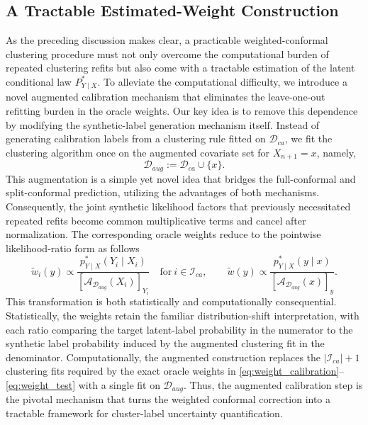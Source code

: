 \documentclass[11pt,letterpaper]{article}
\theoremstyle{definition}
\newcommand{\cD}{\mathcal{D}}
\newcommand{\cI}{\mathcal{I}}
\begin{document}
\subsection{A Tractable Estimated-Weight Construction}
As the preceding discussion makes clear, a practicable weighted-conformal clustering procedure must not only overcome the computational burden of repeated clustering refits but also come with a tractable estimation of the latent conditional law $P_{Y\mid X}^\ast$. To alleviate the computational difficulty, we introduce a novel augmented calibration mechanism that eliminates the leave-one-out refitting burden in the oracle weights. Our key idea is to remove this dependence by modifying the synthetic-label generation mechanism itself. Instead of generating calibration labels from a clustering rule fitted on \(\cD_{ca}\), we fit the clustering algorithm once on the augmented covariate set for $X_{n + 1} = x$, namely,
\[
    \cD_{aug}:=\cD_{ca}\cup\{x\}.
\]
This augmentation is a simple yet novel idea that bridges the full-conformal and split-conformal prediction, utilizing the advantages of both mechanisms. Consequently, the joint synthetic likelihood factors that previously necessitated repeated refits become common multiplicative terms and cancel after normalization. The corresponding oracle weights reduce to the pointwise likelihood-ratio form as follows
\begin{equation}
    \label{eq:augmented_oracle_weights}
    \tilde w_i(y)
    \propto
    \frac{p_{Y\mid X}^\ast\left(Y_i\mid X_i\right)}
    {\left[\mathcal A_{\cD_{aug}}(X_i)\right]_{Y_i}}
    \quad \text{for} ~ i \in \cI_{ca}, 
    \qquad
    \tilde w(y)
    \propto
    \frac{p_{Y\mid X}^\ast(y\mid x)}
    {\left[\mathcal A_{\cD_{aug}}(x)\right]_y}.
\end{equation}
This transformation is both statistically and computationally consequential. Statistically, the weights retain the familiar distribution-shift interpretation, with each ratio comparing the target latent-label probability in the numerator to the synthetic label probability induced by the augmented clustering fit in the denominator. Computationally, the augmented construction replaces the \(|\cI_{ca}|+1\) clustering fits required by the exact oracle weights in \eqref{eq:weight_calibration}--\eqref{eq:weight_test} with a single fit on \(\cD_{aug}\). Thus, the augmented calibration step is the pivotal mechanism that turns the weighted conformal correction into a tractable framework for cluster-label uncertainty quantification.
 
\end{document}
